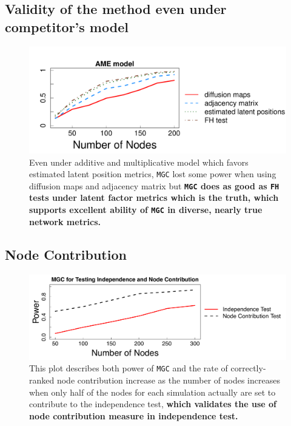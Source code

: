 \documentclass[12pt]{article}
\begin{document}
\subsection*{Validity of the method even under competitor's model}

\begin{figure}[H]
	\centering
	\includegraphics[width=\linewidth]{../Figure/ame_part.pdf}
	\caption{Even under additive and multiplicative model which favors estimated latent position metrics, \texttt{MGC} lost some power when using diffusion maps and adjacency matrix but \textbf{\texttt{MGC} does as good as \texttt{FH} tests under latent factor metrics which is the truth, which supports excellent ability of \texttt{MGC} in diverse, nearly true network metrics.}}
	\label{fig:ame}
\end{figure}	


\subsection*{Node Contribution}

\begin{figure}[h]
	\centering
		\includegraphics[width=0.8\linewidth]{../Figure/nodecontri.pdf}
	\caption{This plot describes both power of \texttt{MGC} and the rate of correctly-ranked node contribution increase as the number of nodes increases when only half of the nodes for each simulation actually are set to contribute to the independence test, \textbf{which validates the use of node contribution measure in independence test.}}
	\label{fig:contribution}
\end{figure}
\end{document}
